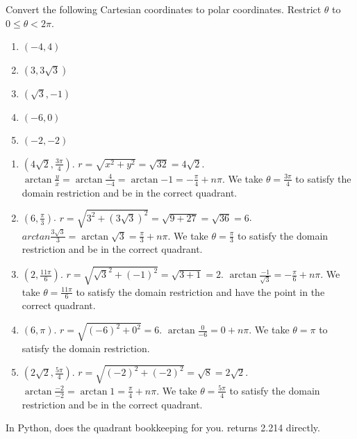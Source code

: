 \begin{Exercise}[label = convert2]
Convert the following Cartesian coordinates to polar coordinates. Restrict 
$\theta$ to $0 \leq \theta < 2\pi$. 
\begin{enumerate}
\item $(-4, 4)$
\item $(3, 3\sqrt{3})$
\item $(\sqrt{3}, -1)$
\item $(-6, 0)$
\item $(-2, -2)$
\end{enumerate}
\end{Exercise}

\begin{Answer}[ref = convert2]
\begin{enumerate}
\item $(4\sqrt{2}, \frac{3\pi}{4})$. $r = \sqrt{x^2 + y^2} = \sqrt{32} = 4
\sqrt{2}$. $\arctan{\frac{y}{x}} = \arctan{\frac{4}{-4}} = \arctan{-1} = -
\frac{\pi}{4} + n\pi$. We take $\theta = \frac{3\pi}{4}$ to satisfy the domain 
restriction and be in the correct quadrant. 
\item $(6, \frac{\pi}{3})$. $r = \sqrt{3^2 + \left( 3\sqrt{3} \right)^2} = 
\sqrt{9 + 27} = \sqrt{36} = 6$. $arctan{\frac{3\sqrt{3}}{3}} = \arctan{\sqrt{
3}} = \frac{\pi}{3} + n\pi$. We take $\theta = \frac{\pi}{3}$ to satisfy the 
domain restriction and be in the correct quadrant. 
\item $(2,\frac{11\pi}{6})$. $r = \sqrt{\sqrt{3}^2 + (-1)^2} = \sqrt{3 + 1} = 
2$. $\arctan{\frac{-1}{\sqrt{3}}} = -\frac{\pi}{6} + n\pi$. We take $\theta = 
\frac{11\pi}{6}$ to satisfy the domain restriction and have the point in the 
correct quadrant. 
\item $(6, \pi)$. $r = \sqrt{(-6)^2 + 0^2} = 6$. $\arctan{\frac{0}{-6}} = 0 + n\pi$. We take $\theta = \pi$ to satisfy the domain restriction. 
\item $(2\sqrt{2}, \frac{5\pi}{4})$. $r = \sqrt{(-2)^2 + (-2)^2} = \sqrt{8} = 
2\sqrt{2}$. $\arctan{\frac{-2}{-2}} = \arctan{1} = \frac{\pi}{4} + n\pi$. We 
take $\theta = \frac{5\pi}{4}$ to satisfy the domain restriction and be in the 
correct quadrant. 
\end{enumerate}
\end{Answer}



In Python,  does the quadrant bookkeeping for
you.  returns 2.214 directly.

